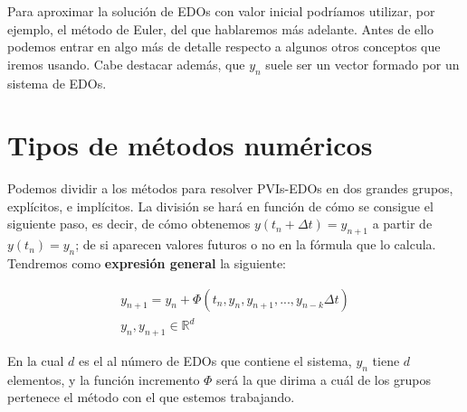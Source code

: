 Para aproximar la solución de EDOs con valor inicial podríamos utilizar, por ejemplo, el método de Euler, del que hablaremos más adelante. Antes de ello podemos entrar en algo más de detalle respecto a algunos otros conceptos que iremos usando. Cabe destacar además, que $y_n$ suele ser un vector formado por un sistema de EDOs.


\section{Tipos de métodos numéricos}

Podemos dividir a los métodos para resolver PVIs-EDOs en dos grandes grupos, explícitos, e implícitos. La división se hará en función de cómo se consigue el siguiente paso, es decir, de cómo obtenemos $y(t_n+\Delta t)=y_{n+1}$ a partir de $y(t_n)=y_n$; de si aparecen valores futuros o no en la fórmula que lo calcula. Tendremos como \textbf{expresión general} la siguiente: \cite{Molero2007}

\begin{equation}
	\label{eq:ExpresionGeneralMetodosUnPaso}
	\begin{split}
		y_{n+1} = y_n + \Phi (t_n, y_n, y_{n+1},...,y_{n-k} \Delta t)\\
		y_n, y_{n+1} \in \mathbb{R}^d
	\end{split}
\end{equation}

En la cual $d$ es el al número de EDOs que contiene el sistema, $y_n$ tiene $d$ elementos, y la función incremento $\Phi$ será la que dirima a cuál de los grupos pertenece el método con el que estemos trabajando.

